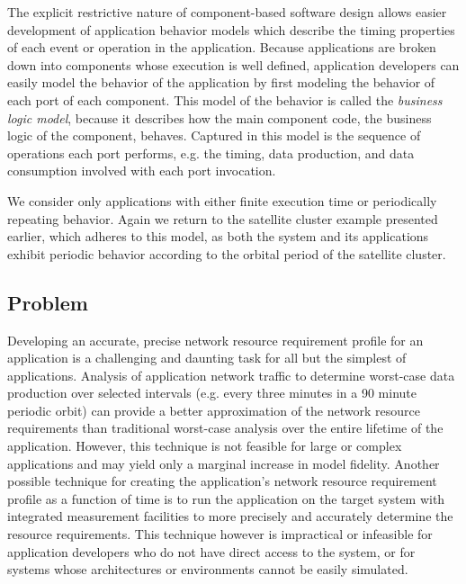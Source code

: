 The explicit restrictive nature of component-based software design allows easier development of application behavior models which describe the timing properties of each event or operation in the application.  Because applications are broken down into components whose execution is well defined, application developers can easily model the behavior of the application by first modeling the behavior of each port of each component.  This model of the behavior is called the \textit{business logic model}, because it describes how the main component code, the business logic of the component, behaves.  Captured in this model is the sequence of operations each port performs, e.g. the timing, data production, and data consumption involved with each port invocation.  

We consider only applications with either finite execution time or periodically repeating behavior.  Again we return to the satellite cluster example presented earlier, which adheres to this model, as both the system and its applications exhibit periodic behavior according to the orbital period of the satellite cluster.  

\subsection{Problem}
Developing an accurate, precise network resource requirement profile for an application is a challenging and daunting task for all but the simplest of applications.  Analysis of application network traffic to determine worst-case data production over selected intervals (e.g. every three minutes in a 90 minute periodic orbit) can provide a better approximation of the network resource requirements than traditional worst-case analysis over the entire lifetime of the application.  However, this technique is not feasible for large or complex applications and may yield only a marginal increase in model fidelity.  Another possible technique for creating the application's network resource requirement profile as a function of time is to run the application on the target system with integrated measurement facilities to more precisely and accurately determine the resource requirements.  This technique however is impractical or infeasible for application developers who do not have direct access to the system, or for systems whose architectures or environments cannot be easily simulated.

